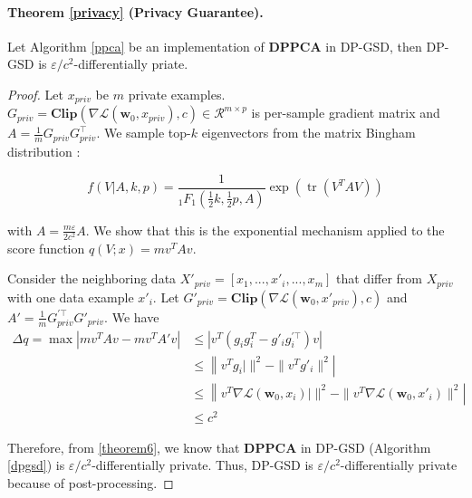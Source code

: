 \documentclass[11pt]{article}
\renewcommand{\epsilon}{\varepsilon}
\begin{document}
\paragraph{Theorem \ref{privacy} (Privacy Guarantee).} Let Algorithm \ref{ppca} be an implementation of $\mathbf{DPPCA}$ in DP-GSD, then DP-GSD is $\epsilon/c^2$-differentially priate.

\begin{proof}
    Let $x_{priv}$ be $m$ private examples. $G_{priv} = \mathbf{Clip}(\nabla \mathcal{L}(\mathbf{w}_0, x_{priv}), c) \in \mathcal{R}^{m\times p}$ is per-sample gradient matrix and $A = \frac{1}{m}G_{priv}G_{priv}^{\top}$. We sample top-$k$ eigenvectors from the matrix Bingham distribution \cite{matrixbingham}:

    \begin{equation}
    f(V | A, k, p)=\frac{1}{{ }_1 F_1\left(\frac{1}{2} k, \frac{1}{2} p, A\right)} \exp \left(\operatorname{tr}\left(V^T A V\right)\right)
    \end{equation}

    with $A = \frac{m\epsilon}{2c^2}A$. We show that this is the exponential mechanism applied to the score function $q(V; x) = mv^TAv$. 
    
    Consider the neighboring data $X'_{priv} = [x_1, ..., x'_i, ..., x_m]$ that differ from $X_{priv}$ with one data example $x'_i$. Let $G'_{priv} = \mathbf{Clip}(\nabla \mathcal{L}(\mathbf{w}_0, x'_{priv}), c)$ and $A' = \frac{1}{m}G_{priv}^{'\top}G'_{priv}$. We have
    \begin{equation}
    \begin{aligned}
        \Delta q = \max \left|mv^TAv - mv^TA'v \right| & \le \left|v^T(g_ig_i^T - g'_ig^{'\top}_i)v\right| \\
        & \le \left\|v^Tg_i|\|^2 - \| v^Tg'_i\|^2\right| \\
        & \le \left\|v^T\nabla \mathcal{L}(\mathbf{w}_0, x_i)|\|^2 - \| v^T\nabla \mathcal{L}(\mathbf{w}_0, x'_i)\|^2\right| \\
        & \le c^2
    \end{aligned}
    \end{equation}
    
    Therefore, from \ref{theorem6}, we know that $\mathbf{DPPCA}$ in DP-GSD (Algorithm \ref{dpgsd}) is $\epsilon/c^2$-differentially private. Thus, DP-GSD is $\epsilon/c^2$-differentially private because of post-processing.
\end{proof}
\end{document}
